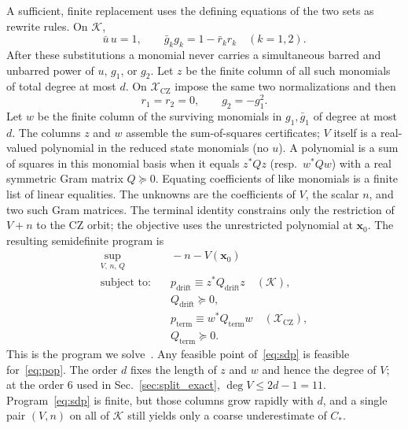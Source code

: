 \documentclass[aps,prx,reprint,nofootinbib,longbibliography,floatfix]{revtex4-2}
\theoremstyle{plain}
\theoremstyle{remark}
\newcommand{\xv}{\boldsymbol{x}}
\begin{document}
A sufficient, finite replacement uses the defining equations of the two sets as
rewrite rules. On $\mathcal K$,
\begin{equation*}
\bar u\,u=1,\qquad \bar g_k g_k=1-\bar r_k r_k\quad (k=1,2).
\end{equation*}
After these substitutions a monomial never carries a
simultaneous barred and unbarred power of $u$, $g_1$, or $g_2$.
Let $z$ be the finite column of all such monomials of total degree at
most $d$. On $\mathcal{X}_{\mathrm{CZ}}$ impose the same two normalizations and
then
\begin{equation*}
r_1=r_2=0,\qquad g_2=-g_1^2.
\end{equation*}
Let $w$ be the finite column of the surviving monomials in $g_1,\bar g_1$ of
degree at most $d$. The columns $z$ and $w$ assemble the sum-of-squares
certificates; $V$ itself is a real-valued polynomial in the reduced state
monomials (no $u$). A polynomial is a sum of squares in this monomial basis when
it equals $z^*Qz$ (resp.\ $w^*Qw$) with a real symmetric
Gram matrix $Q\succeq0$. Equating coefficients of like monomials is a finite
list of linear equalities. The unknowns are the coefficients of $V$, the
scalar $n$, and two such Gram matrices. The terminal identity constrains only
the restriction of $V+n$ to the CZ orbit; the objective uses the unrestricted
polynomial at $\xv_0$. The resulting semidefinite program is
\begin{equation}
\begin{aligned}
\sup_{V,\,n,\,Q}
& \quad -n-V(\xv_0) \\
\text{subject to:}
& \quad p_{\mathrm{drift}}
\equiv z^*Q_{\mathrm{drift}}z
\quad (\mathcal K), \\
& \quad Q_{\mathrm{drift}}\succeq0, \\
& \quad p_{\mathrm{term}}
\equiv w^*Q_{\mathrm{term}}w
\quad (\mathcal{X}_{\mathrm{CZ}}), \\
& \quad Q_{\mathrm{term}}\succeq0.
\end{aligned}
\label{eq:sdp}
\end{equation}
This is the program we solve~\cite{Lasserre01,Parrilo03,Putinar93}. Any
feasible point of~\eqref{eq:sdp} is feasible for~\eqref{eq:pop}. The order $d$
fixes the length of $z$ and $w$ and hence the degree of $V$; at the order $6$
used in Sec.~\ref{sec:split_exact}, $\deg V\le 2d-1=11$. Program~\eqref{eq:sdp}
is finite, but those columns grow rapidly with $d$, and a single pair $(V,n)$
on all of $\mathcal{K}$ still yields only a coarse underestimate of $C_*$.
\end{document}
